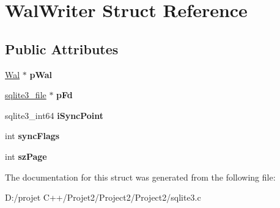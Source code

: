 \hypertarget{struct_wal_writer}{}\section{Wal\+Writer Struct Reference}
\label{struct_wal_writer}
\subsection*{Public Attributes}
\begin{DoxyCompactItemize}
\item 
\mbox{\label{struct_wal_writer_a3ed1cabab4a2f0572ec04d2a174e5bf9}} 
\mbox{\hyperlink{struct_wal}{Wal}} $\ast$ {\bfseries p\+Wal}
\item 
\mbox{\label{struct_wal_writer_a0c98cddd084b97d9f531fa71b92ef40a}} 
\mbox{\hyperlink{structsqlite3__file}{sqlite3\+\_\+file}} $\ast$ {\bfseries p\+Fd}
\item 
\mbox{\label{struct_wal_writer_a1227aea1e12b6b409e8a7cdbae43588e}} 
sqlite3\+\_\+int64 {\bfseries i\+Sync\+Point}
\item 
\mbox{\label{struct_wal_writer_acc8dcbdc9b91bae4799b5de113742ae6}} 
int {\bfseries sync\+Flags}
\item 
\mbox{\label{struct_wal_writer_aa161832c97830aed52410747ebde5e6e}} 
int {\bfseries sz\+Page}
\end{DoxyCompactItemize}


The documentation for this struct was generated from the following file\+:\begin{DoxyCompactItemize}
\item 
D\+:/projet C++/\+Projet2/\+Project2/\+Project2/sqlite3.\+c\end{DoxyCompactItemize}

